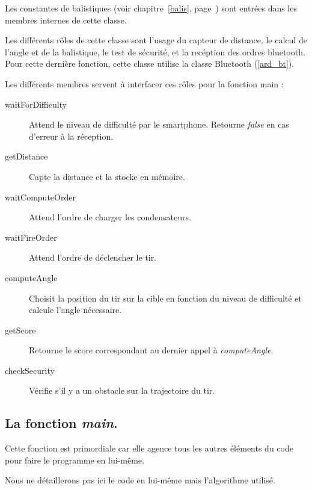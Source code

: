 Les constantes de balistiques (voir chapitre~\ref{balis}, page~\pageref{balis}) sont entrées dans les membres internes de cette classe.

Les différents rôles de cette classe sont l'usage du capteur de distance, le calcul de l'angle et de la balistique, le test de sécurité, et la recéption des ordres bluetooth. Pour cette dernière fonction, cette classe utilise la classe Bluetooth (\ref{ard_bt}).

Les différents membres servent à interfacer ces rôles pour la fonction main : \begin{description}
	\item[waitForDifficulty] Attend le niveau de difficulté par le smartphone. Retourne \emph{false} en cas d'erreur à la réception.
	\item[getDistance] Capte la distance et la stocke en mémoire.
	\item[waitComputeOrder] Attend l'ordre de charger les condensateurs.
	\item[waitFireOrder] Attend l'ordre de déclencher le tir.
	\item[computeAngle] Choisit la position du tir sur la cible en fonction du niveau de difficulté et calcule l'angle nécessaire.
	\item[getScore] Retourne le score correspondant au dernier appel à \emph{computeAngle}.
	\item[checkSecurity] Vérifie s'il y a un obstacle sur la trajectoire du tir.
\end{description}

\subsection{La fonction \emph{main}.} \label{ard_main}
Cette fonction est primordiale car elle agence tous les autres éléments du code pour faire le programme en lui-même.

Nous ne détaillerons pas ici le code en lui-même mais l'algorithme utilisé.

